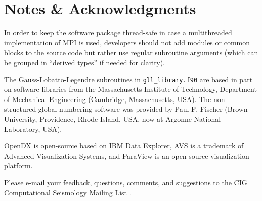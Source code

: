 

\chapter*{Notes \& Acknowledgments}

In order to keep the software package thread-safe in case a multithreaded
implementation of MPI is used, developers should not add modules or
common blocks to the source code but rather use regular subroutine
arguments (which can be grouped in ``derived types'' if needed for
clarity).

The Gauss-Lobatto-Legendre subroutines in \texttt{gll\_library.f90}
are based in part on software libraries from the Massachusetts Institute
of Technology, Department of Mechanical Engineering (Cambridge, Massachusetts,
USA). The non-structured global numbering software was provided by
Paul F. Fischer (Brown University, Providence, Rhode Island, USA,
now at Argonne National Laboratory, USA).

OpenDX  is open-source
based on IBM Data Explorer, AVS 
is a trademark of Advanced Visualization Systems, and ParaView 
is an open-source visualization platform.

Please e-mail your feedback, questions, comments, and suggestions
to the CIG Computational Seismology Mailing List .

